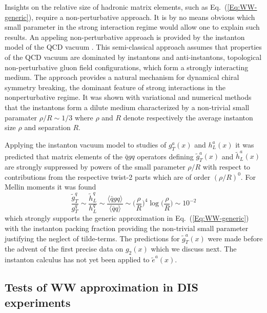 \documentclass[a4paper,11pt]{article}
\newcommand{\be}{\begin{equation}}
\newcommand{\ee}{\end{equation}}
\newcommand{\la}{\langle}
\newcommand{\ra}{\rangle}
\begin{document}
Insights on the relative size of hadronic matrix elements, such as 
Eq.~(\ref{Eq:WW-generic}), require a non-perturbative approach. It is 
by no means obvious which small parameter in the strong interaction 
regime would allow one to explain such results. An appeling 
non-perturbative approach is provided by the instanton model of 
the QCD vacuum \cite{Shuryak:1981ff,Diakonov:1983hh,Diakonov:1995qy}.
This semi-classical approach assumes that properties of the QCD vacuum 
are dominated by instantons and anti-instantons, topological non-perturbative 
gluon field configurations, which form a strongly interacting medium.
The approach provides a natural mechanism for dynamical chiral symmetry 
breaking, the dominant feature of strong interactions in the nonperturbative
regime. It was shown with variational and numerical methods that the 
instantons form a dilute medium characterized by a non-trivial small paramater
$\rho/R\sim1/3$ \cite{Shuryak:1981ff,Diakonov:1983hh,Diakonov:1995qy}
where $\rho$ and $R$ denote respectively the average instanton size $\rho$
and separation $R$.

Applying the instanton vacuum model to studies of $g_T^a(x)$ and $h_L^a(x)$
it was predicted that matrix elements of the $\bar{q}gq$ operators defining 
$\tilde{g}_T^a(x)$ \cite{Balla:1997hf} and $\tilde{h}_L^a(x)$ 
\cite{Dressler:1999hc} are strongly suppressed by powers of the small
parameter $\rho/R$ with respect to contributions from the 
respective twist-2 parts which are of order $(\rho/R)^0$. 
For Mellin moments it was found \cite{Balla:1997hf,Dressler:1999hc}
\be\label{Eq:WW-instanoton}
	\frac{\tilde{g}_T^q}{g_T^q} \sim \frac{\tilde{h}_L^q}{h_L^q} 
	\sim \frac{\la\bar{q}gq\ra}{\la\bar{q}q\ra} \sim 
	\biggl(\frac{\rho}{R}\biggr)^{\!4} \log\biggl(\frac{\rho}{R}\biggr)
	\sim 10^{-2}
\ee
which strongly supports the generic approximation
in Eq.~(\ref{Eq:WW-generic}) with the instanton packing fraction providing 
the non-trivial small parameter justifying the neglect of tilde-terms. 
The predictions for $\tilde{g}_T^a(x)$ \cite{Balla:1997hf}
were made before the advent of the first precise data on $g_2(x)$
which we discuss next.
The instanton calculus has not yet been applied to $\tilde{e}^a(x)$.


\subsection{Tests of WW approximation in DIS experiments}
\label{Sec-3.4:WW-classic-experiment}
\end{document}
